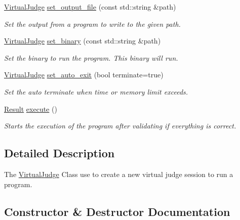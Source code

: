 \begin{DoxyCompactItemize}
\mbox{\hyperlink{classtestcaser_1_1integrator_1_1VirtualJudge}{Virtual\+Judge}} \mbox{\hyperlink{classtestcaser_1_1integrator_1_1VirtualJudge_ac806c80611eb6e6049f3376790d4b42a}{set\+\_\+output\+\_\+file}} (const std\+::string \&path)
\begin{DoxyCompactList}\small\item\em Set the output from a program to write to the given path. \end{DoxyCompactList}\item 
\mbox{\hyperlink{classtestcaser_1_1integrator_1_1VirtualJudge}{Virtual\+Judge}} \mbox{\hyperlink{classtestcaser_1_1integrator_1_1VirtualJudge_aae183fb21dfffe38efcfb904d482b299}{set\+\_\+binary}} (const std\+::string \&path)
\begin{DoxyCompactList}\small\item\em Set the binary to run the program. This binary will run. \end{DoxyCompactList}\item 
\mbox{\hyperlink{classtestcaser_1_1integrator_1_1VirtualJudge}{Virtual\+Judge}} \mbox{\hyperlink{classtestcaser_1_1integrator_1_1VirtualJudge_a9160dd070c63084495fe6d29cab58cb4}{set\+\_\+auto\+\_\+exit}} (bool terminate=true)
\begin{DoxyCompactList}\small\item\em Set the auto terminate when time or memory limit exceeds. \end{DoxyCompactList}\item 
\mbox{\hyperlink{classtestcaser_1_1integrator_1_1Result}{Result}} \mbox{\hyperlink{classtestcaser_1_1integrator_1_1VirtualJudge_ab50e9c4506fba192fd44fce0f2a21744}{execute}} ()
\begin{DoxyCompactList}\small\item\em Starts the execution of the program after validating if everything is correct. \end{DoxyCompactList}\end{DoxyCompactItemize}


\subsection{Detailed Description}
The \mbox{\hyperlink{classtestcaser_1_1integrator_1_1VirtualJudge}{Virtual\+Judge}} Class use to create a new virtual judge session to run a program. 



\subsection{Constructor \& Destructor Documentation}
\mbox{\label{classtestcaser_1_1integrator_1_1VirtualJudge_a10b68744cc523bcc8abe1ddca7a281dc}} 
